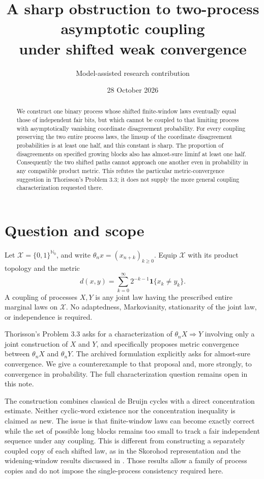 \documentclass[11pt]{article}
\title{A sharp obstruction to two-process asymptotic coupling\protect\\under shifted weak convergence}
\author{Model-assisted research contribution}
\date{28 October 2026}
\newcommand{\ind}{\mathbf 1}
\begin{document}
\maketitle

\begin{abstract}
We construct one binary process whose shifted finite-window laws eventually equal those of independent fair bits, but which cannot be coupled to that limiting process with asymptotically vanishing coordinate disagreement probability. For every coupling preserving the two entire process laws, the limsup of the coordinate disagreement probabilities is at least one half, and this constant is sharp. The proportion of disagreements on specified growing blocks also has almost-sure liminf at least one half. Consequently the two shifted paths cannot approach one another even in probability in any compatible product metric. This refutes the particular metric-convergence suggestion in Thorisson's Problem 3.3; it does not supply the more general coupling characterization requested there.
\end{abstract}

\section{Question and scope}

Let \(\mathcal X=\{0,1\}^{\mathbb N_0}\), and write
\(\theta_n x=(x_{n+k})_{k\geq0}\). Equip \(\mathcal X\) with its product topology and the metric
\[
 d(x,y)=\sum_{k=0}^{\infty}2^{-k-1}\ind\{x_k\ne y_k\}.
\]
A coupling of processes \(X,Y\) is any joint law having the prescribed entire marginal laws on \(\mathcal X\). No adaptedness, Markovianity, stationarity of the joint law, or independence is required.

Thorisson's Problem 3.3 \cite[p.~4]{thorisson} asks for a characterization of \(\theta_nX\Rightarrow Y\) involving only a joint construction of \(X\) and \(Y\), and specifically proposes metric convergence between \(\theta_nX\) and \(\theta_nY\). The archived formulation \cite{archive} explicitly asks for almost-sure convergence. We give a counterexample to that proposal and, more strongly, to convergence in probability. The full characterization question remains open in this note.

The construction combines classical de Bruijn cycles with a direct concentration estimate. Neither cyclic-word existence nor the concentration inequality is claimed as new. The issue is that finite-window laws can become exactly correct while the set of possible long blocks remains too small to track a fair independent sequence under any coupling. This is different from constructing a separately coupled copy of each shifted law, as in the Skorohod representation and the widening-window results discussed in \cite[Section~1]{windows}. Those results allow a family of process copies and do not impose the single-process consistency required here.
\end{document}
